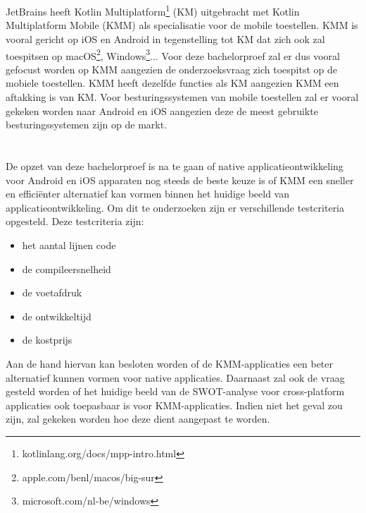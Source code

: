 \section{}
\label{sec:afbakening}

JetBrains heeft Kotlin Multiplatform\footnote{kotlinlang.org/docs/mpp-intro.html} (KM) uitgebracht met Kotlin Multiplatform Mobile (KMM) als specialisatie voor de mobile toestellen. KMM is vooral gericht op iOS en Android in tegenstelling tot KM dat zich ook zal toespitsen op macOS\footnote{apple.com/benl/macos/big-sur}, Windows\footnote{microsoft.com/nl-be/windows}... Voor deze bachelorproef zal er dus vooral gefocust worden op KMM aangezien de onderzoeksvraag zich toespitst op de mobiele toestellen. KMM heeft dezelfde functies als KM aangezien KMM een aftakking is van KM. Voor besturingssystemen van mobile toestellen zal er vooral gekeken worden naar Android en iOS aangezien deze de meest gebruikte besturingssystemen zijn op de markt.


\section{}
\label{sec:onderzoeksvraag}

De opzet van deze bachelorproef is na te gaan of native applicatieontwikkeling voor Android en iOS apparaten nog steeds de beste keuze is of KMM een sneller en efficiënter alternatief kan vormen binnen het huidige beeld van applicatieontwikkeling. Om dit te onderzoeken zijn er verschillende testcriteria opgesteld. Deze testcriteria zijn: 
\begin{itemize}
    \item het aantal lijnen code
    \item de compileersnelheid
    \item de voetafdruk
    \item de ontwikkeltijd
    \item de kostprijs
\end{itemize}
Aan de hand hiervan kan besloten worden of de KMM-applicaties een beter alternatief kunnen vormen voor native applicaties. Daarnaast zal ook de vraag gesteld worden of het huidige beeld van de SWOT-analyse voor cross-platform applicaties ook toepasbaar is voor KMM-applicaties. Indien niet het geval zou zijn, zal gekeken worden hoe deze dient aangepast te worden. 

